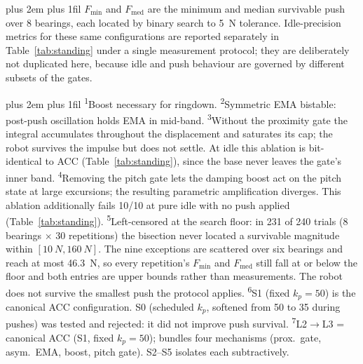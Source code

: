 \documentclass[a4paper,fleqn]{cas-dc}
\newcommand{\tabnote}{\par\leftskip=0pt\rightskip=0pt plus 2em%
  \parfillskip=0pt plus 1fil\relax}
\begin{document}
\begin{table}[pos=!tbp]
\begin{tabular}{@{}c>{\raggedright\arraybackslash}p{3.1cm}rr>{\raggedright\arraybackslash}p{1.5cm}@{}}
\bottomrule
\end{tabular}
\vspace{2pt}\tabnote\noindent
$F_{\min}$ and $F_{\text{med}}$ are the minimum and median survivable push over \num{8} bearings, each located by binary search to \SI{5}{N} tolerance. Idle-precision metrics for these same configurations are reported separately in Table~\ref{tab:standing} under a single measurement protocol; they are deliberately not duplicated here, because idle and push behaviour are governed by different subsets of the gates.\tabnote\noindent
\textsuperscript{1}Boost necessary for ringdown.
\textsuperscript{2}Symmetric EMA bistable: post-push oscillation holds EMA in mid-band.
\textsuperscript{3}Without the proximity gate the integral accumulates throughout the displacement and saturates its cap; the robot survives the impulse but does not settle. At idle this ablation is bit-identical to ACC (Table~\ref{tab:standing}), since the base never leaves the gate's inner band.
\textsuperscript{4}Removing the pitch gate lets the damping boost act on the pitch state at large excursions; the resulting parametric amplification diverges. This ablation additionally fails \num{10}/\num{10} at pure idle with no push applied (Table~\ref{tab:standing}).
\textsuperscript{5}Left-censored at the search floor: in \num{231} of \num{240} trials (\num{8} bearings ${\times}$ \num{30} repetitions) the bisection never located a survivable magnitude within $[\SI{10}{N},\SI{160}{N}]$. The nine exceptions are scattered over six bearings and reach at most \SI{46.3}{N}, so every repetition's $F_{\min}$ and $F_{\text{med}}$ still fall at or below the floor and both entries are upper bounds rather than measurements. The robot does not survive the smallest push the protocol applies.
\textsuperscript{6}S1 (fixed $k_p{=}50$) is the canonical ACC configuration. S0 (scheduled $k_p$, softened from 50 to 35 during pushes) was tested and rejected: it did not improve push survival. \textsuperscript{7}L2$\rightarrow$L3 = canonical ACC (S1, fixed $k_p{=}50$); bundles four mechanisms (prox.\ gate, asym.\ EMA, boost, pitch gate). S2--S5 isolates each subtractively.

\end{table}
\end{document}
